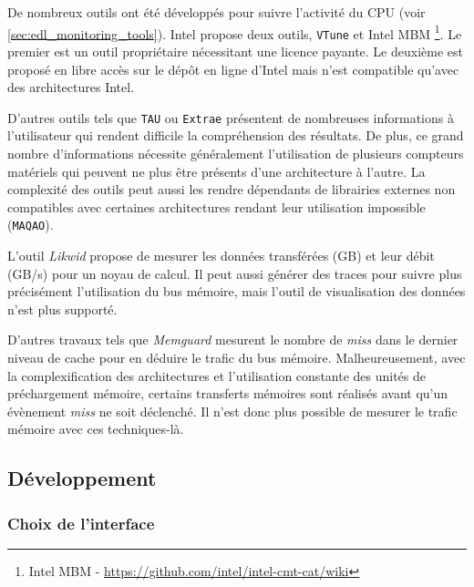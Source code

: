         De nombreux outils ont été développés pour suivre l'activité du CPU (voir \autoref{sec:edl_monitoring_tools}). Intel propose deux outils, \verb|VTune|\cite{reinders2005vtune} et Intel MBM \footnote{Intel MBM - \url{https://github.com/intel/intel-cmt-cat/wiki}}. Le premier est un outil propriétaire nécessitant une licence payante. Le deuxième est proposé en libre accès sur le dépôt en ligne d'Intel mais n'est compatible qu'avec des architectures Intel.
        
        D'autres outils tels que \verb=TAU= ou \verb=Extrae= présentent de nombreuses informations à l'utilisateur qui rendent difficile la compréhension des résultats. De plus, ce grand nombre d'informations nécessite généralement l'utilisation de plusieurs compteurs matériels qui peuvent ne plus être présents d'une architecture à l'autre. La complexité des outils peut aussi les rendre dépendants de librairies externes non compatibles avec certaines architectures rendant leur utilisation impossible (\verb|MAQAO|).
        
        L'outil \textit{Likwid} propose de mesurer les données transférées (GB) et leur débit (GB/s) pour un noyau de calcul. Il peut aussi générer des traces pour suivre plus précisément l'utilisation du bus mémoire, mais l'outil de visualisation des données n'est plus supporté.
        
        D'autres travaux tels que \textit{Memguard}\cite{Yun2013} mesurent le nombre de \textit{miss} dans le dernier niveau de cache pour en déduire le trafic du bus mémoire. Malheureusement, avec la complexification des architectures et l'utilisation constante des unités de préchargement mémoire, certains transferts mémoires sont réalisés avant qu'un évènement \textit{miss} ne soit déclenché. Il n'est donc plus possible de mesurer le trafic mémoire avec ces techniques-là. 

      
    

\subsection{Développement}

    \subsubsection{Choix de l'interface}
        
